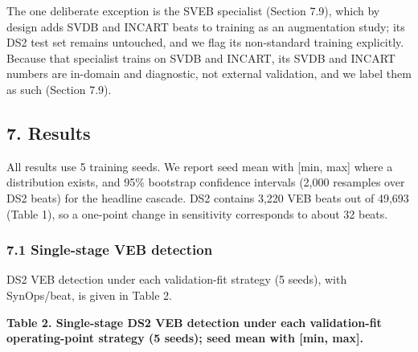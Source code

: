 \documentclass[
]{article}
\begin{document}
The one deliberate exception is the SVEB specialist (Section 7.9), which
by design adds SVDB and INCART beats to training as an augmentation
study; its DS2 test set remains untouched, and we flag its non-standard
training explicitly. Because that specialist trains on SVDB and INCART,
its SVDB and INCART numbers are in-domain and diagnostic, not external
validation, and we label them as such (Section 7.9).

\subsection{7. Results}\label{results}

All results use 5 training seeds. We report seed mean with {[}min,
max{]} where a distribution exists, and 95\% bootstrap confidence
intervals (2,000 resamples over DS2 beats) for the headline cascade. DS2
contains 3,220 VEB beats out of 49,693 (Table 1), so a one-point change
in sensitivity corresponds to about 32 beats.

\subsubsection{7.1 Single-stage VEB
detection}\label{single-stage-veb-detection}

DS2 VEB detection under each validation-fit strategy (5 seeds), with
SynOps/beat, is given in Table 2.

\textbf{Table 2. Single-stage DS2 VEB detection under each
validation-fit operating-point strategy (5 seeds); seed mean with
{[}min, max{]}.}
\end{document}
